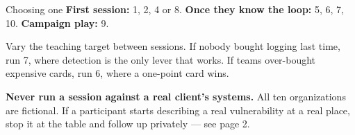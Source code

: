 \documentclass[9pt,letterpaper]{extarticle}
\begin{document}
\vspace{0.9em}
\begin{graybox}{Choosing one}
\textbf{First session:} 1, 2, 4 or 8. \quad \textbf{Once they know the loop:}
5, 6, 7, 10. \quad \textbf{Campaign play:} 9.
\vspace{0.3em}

Vary the teaching target between sessions. If nobody bought logging last time,
run 7, where detection is the only lever that works. If teams over-bought
expensive cards, run 6, where a one-point card wins.
\end{graybox}

\vspace{0.5em}
{\footnotesize\color{deep}\textbf{Never run a session against a real client's
systems.} All ten organizations are fictional. If a participant starts
describing a real vulnerability at a real place, stop it at the table and follow
up privately --- see page 2.}
\end{document}
